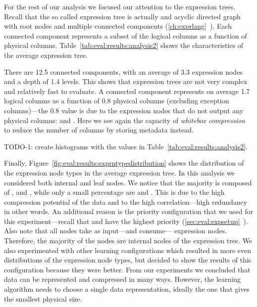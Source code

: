 For the rest of our analysis we focused our attention to the expression trees. Recall that the so called expression tree is actually and acyclic directed graph with root nodes and multiple connected components (\ref{ch:exprlang}~). Each connected component represents a subset of the logical columns as a function of physical columns. Table~\ref{tab:eval:results:analysis2} shows the characteristics of the average expression tree.



There are 12.5 connected components, with an average of 3.3 expression nodes and a depth of 1.4 levels. This shows that expression trees are not very complex and relatively fast to evaluate. A connected component represents on average 1.7 logical columns as a function of 0.8 physical columns (excluding exception columns)---the 0.8 value is due to the expression nodes that do not output any physical columns:  and . Here we see again the capacity of \textit{whitebox compression} to reduce the number of columns by storing metadata instead.

TODO-1: create histograms with the values in Table~\ref{tab:eval:results:analysis2}.

Finally, Figure~\ref{fig:eval:results:exprntypedistribution} shows the distribution of the expression node types in the average expression tree. In this analysis we considered both internal and leaf nodes. We notice that the majority is composed of ,  and , while only a small percentage are  and . This is due to the high  compression potential of the data and to the high correlation---high redundancy in other words. An additional reason is the priority configuration that we used for this experiment---recall that  and  have the highest priority (\ref{sec:eval:expsetup}~). Also note that all  nodes take as input---and consume--- expression nodes. Therefore, the majority of the  nodes are internal nodes of the expression tree. We also experimented with other learning configurations which resulted in more even distributions of the expression node types, but decided to show the results of this configuration because they were better. From our experiments we concluded that data can be represented and compressed in many ways. However, the learning algorithm needs to choose a single data representation, ideally the one that gives the smallest physical size.


